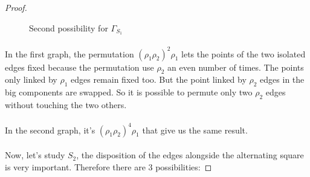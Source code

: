 \begin{proof}
  \begin{figure}[H]
    \begin{center}
      \caption{Second possibility for $\Gamma_{S_1}$}
    \end{center}
  \end{figure}

  \paragraph{}
  In the first graph, the permutation $(\rho_1 \rho_2)^2 \rho_1$ lets the points of the two isolated edges fixed because the permutation use $\rho_2$ an even number of times. The points only linked by $\rho_1$ edges remain fixed too. But the point linked by $\rho_2$ edges in the big components are swapped. So it is possible to permute only two $\rho_2$ edges without touching the two others.

  \paragraph{}
  In the second graph, it's $(\rho_1\rho_2)^4 \rho_1$ that give us the same result.

  \paragraph{}
  Now, let's study $S_2$, the disposition of the edges alongside the alternating square is very important. Therefore there are 3 possibilities:


\end{proof}
